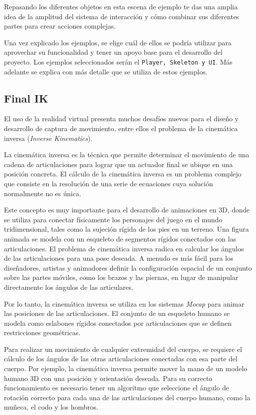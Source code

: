 Repasando los diferentes objetos en esta escena de ejemplo te das una amplia idea de la amplitud del sistema de interacción y cómo combinar sus diferentes partes para crear acciones complejas.

Una vez explicado los ejemplos, se elige cuál de ellos se podría utilizar para aprovechar su funcionalidad y tener un apoyo base para el desarrollo del proyecto. Los ejemplos seleccionados serán el \texttt {Player, Skeleton y UI}. Más adelante se explica con más detalle que se utiliza de estos ejemplos.


\subsection{Final IK}

El uso de la realidad virtual presenta muchos desafíos nuevos para el diseño y desarrollo de captura de movimiento, entre ellos el problema de la cinemática inversa (\textit{Inverse Kinematics}). 

La cinemática inversa es la técnica que permite determinar el movimiento de una cadena de articulaciones para lograr que un actuador final se ubique en una posición concreta. El cálculo de la cinemática inversa es un problema complejo que consiste en la resolución de una serie de ecuaciones cuya solución normalmente no es única.\cite{CinematicaInversa}

Este concepto es muy importante para el desarrollo de animaciones en 3D, donde se utiliza para conectar físicamente los personajes del juego en el mundo tridimensional, tales como la sujeción rígida de los pies en un terreno. Una figura animada se modela con un esqueleto de segmentos rígidos conectados con las articulaciones. El problema de cinemática inversa radica en calcular los ángulos de las articulaciones para una pose deseada. A menudo es más fácil para los diseñadores, artistas y animadores definir la configuración espacial de un conjunto sobre las partes móviles, como los brazos y las piernas, en lugar de manipular directamente los ángulos de las articulares. 

Por lo tanto, la cinemática inversa se utiliza en los sistemas \textit{Mocap} para animar las posiciones de las articulaciones. El conjunto de un esqueleto humano se modela como eslabones rígidos conectados por articulaciones que se definen restricciones geométricas. 

Para realizar un movimiento de cualquier extremidad del cuerpo, se requiere el cálculo de los ángulos de las otras articulaciones conectadas con esa parte del cuerpo. Por ejemplo, la cinemática inversa permite mover la mano de un modelo humano 3D con una posición y orientación deseada. Para su correcto funcionamiento es necesario tener un algoritmo que seleccione el ángulo de rotación correcto para cada una de las articulaciones del cuerpo humano, como la muñeca, el codo y los hombros.

